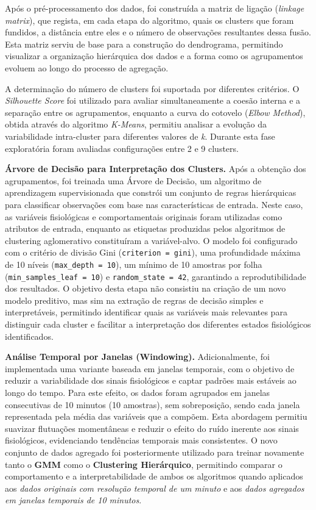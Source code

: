 Após o pré-processamento dos dados, foi construída a matriz de ligação (\textit{linkage matrix}), que regista, em cada etapa do algoritmo, quais os clusters que foram fundidos, a distância entre eles e o número de observações resultantes dessa fusão. Esta matriz serviu de base para a construção do dendrograma, permitindo visualizar a organização hierárquica dos dados e a forma como os agrupamentos evoluem ao longo do processo de agregação.

A determinação do número de clusters foi suportada por diferentes critérios. O \textit{Silhouette Score} foi utilizado para avaliar simultaneamente a coesão interna e a separação entre os agrupamentos, enquanto a curva do cotovelo (\textit{Elbow Method}), obtida através do algoritmo \textit{K-Means}, permitiu analisar a evolução da variabilidade intra-cluster para diferentes valores de \textit{k}. Durante esta fase exploratória foram avaliadas configurações entre 2 e 9 clusters.

\textbf{Árvore de Decisão para Interpretação dos Clusters.}  
Após a obtenção dos agrupamentos, foi treinada uma Árvore de Decisão, um algoritmo de aprendizagem supervisionada que constrói um conjunto de regras hierárquicas para classificar observações com base nas características de entrada. Neste caso, as variáveis fisiológicas e comportamentais originais foram utilizadas como atributos de entrada, enquanto as etiquetas produzidas pelos algoritmos de clustering aglomerativo constituíram a variável-alvo. O modelo foi configurado com o critério de divisão Gini (\texttt{criterion = gini}), uma profundidade máxima de 10 níveis (\texttt{max\_depth = 10}), um mínimo de 10 amostras por folha (\texttt{min\_samples\_leaf = 10}) e \texttt{random\_state = 42}, garantindo a reprodutibilidade dos resultados. O objetivo desta etapa não consistiu na criação de um novo modelo preditivo, mas sim na extração de regras de decisão simples e interpretáveis, permitindo identificar quais as variáveis mais relevantes para distinguir cada cluster e facilitar a interpretação dos diferentes estados fisiológicos identificados.

\textbf{Análise Temporal por Janelas (Windowing).}  
Adicionalmente, foi implementada uma variante baseada em janelas temporais, com o objetivo de reduzir a variabilidade dos sinais fisiológicos e captar padrões mais estáveis ao longo do tempo. Para este efeito, os dados foram agrupados em janelas consecutivas de 10 minutos (10 amostras), sem sobreposição, sendo cada janela representada pela média das variáveis que a compõem. Esta abordagem permitiu suavizar flutuações momentâneas e reduzir o efeito do ruído inerente aos sinais fisiológicos, evidenciando tendências temporais mais consistentes. O novo conjunto de dados agregado foi posteriormente utilizado para treinar novamente tanto o \textbf{GMM} como o \textbf{Clustering Hierárquico}, permitindo comparar o comportamento e a interpretabilidade de ambos os algoritmos quando aplicados aos \textit{dados originais com resolução temporal de um minuto} e aos \textit{dados agregados em janelas temporais de 10 minutos}.

